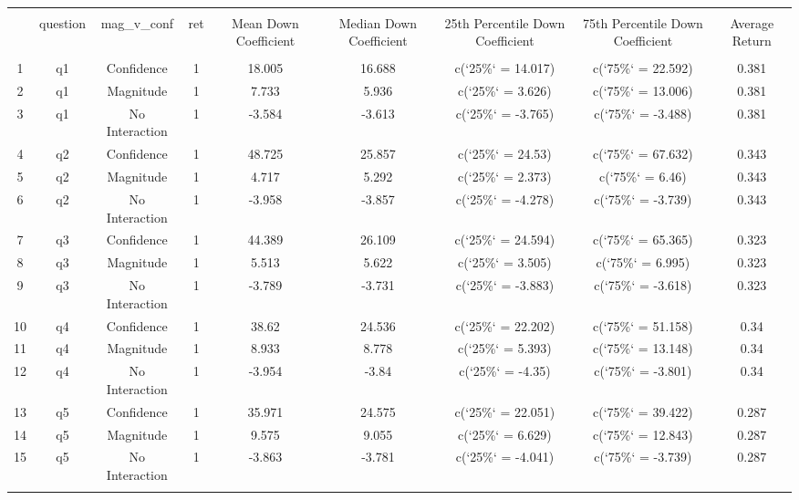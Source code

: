 
\begin{table}[!htbp] \centering 
  \caption{} 
  \label{} 
\begin{tabular}{@{\extracolsep{5pt}} ccccccccc} 
\\[-1.8ex]\hline 
\hline \\[-1.8ex] 
 & question & mag\_v\_conf & ret & Mean Down Coefficient & Median Down Coefficient & 25th Percentile Down Coefficient & 75th Percentile Down Coefficient & Average Return \\ 
\hline \\[-1.8ex] 
1 & q1 & Confidence & 1 & 18.005 & 16.688 & c(`25\%` = 14.017) & c(`75\%` = 22.592) & 0.381 \\ 
2 & q1 & Magnitude & 1 & 7.733 & 5.936 & c(`25\%` = 3.626) & c(`75\%` = 13.006) & 0.381 \\ 
3 & q1 & No Interaction & 1 & -3.584 & -3.613 & c(`25\%` = -3.765) & c(`75\%` = -3.488) & 0.381 \\ 
4 & q2 & Confidence & 1 & 48.725 & 25.857 & c(`25\%` = 24.53) & c(`75\%` = 67.632) & 0.343 \\ 
5 & q2 & Magnitude & 1 & 4.717 & 5.292 & c(`25\%` = 2.373) & c(`75\%` = 6.46) & 0.343 \\ 
6 & q2 & No Interaction & 1 & -3.958 & -3.857 & c(`25\%` = -4.278) & c(`75\%` = -3.739) & 0.343 \\ 
7 & q3 & Confidence & 1 & 44.389 & 26.109 & c(`25\%` = 24.594) & c(`75\%` = 65.365) & 0.323 \\ 
8 & q3 & Magnitude & 1 & 5.513 & 5.622 & c(`25\%` = 3.505) & c(`75\%` = 6.995) & 0.323 \\ 
9 & q3 & No Interaction & 1 & -3.789 & -3.731 & c(`25\%` = -3.883) & c(`75\%` = -3.618) & 0.323 \\ 
10 & q4 & Confidence & 1 & 38.62 & 24.536 & c(`25\%` = 22.202) & c(`75\%` = 51.158) & 0.34 \\ 
11 & q4 & Magnitude & 1 & 8.933 & 8.778 & c(`25\%` = 5.393) & c(`75\%` = 13.148) & 0.34 \\ 
12 & q4 & No Interaction & 1 & -3.954 & -3.84 & c(`25\%` = -4.35) & c(`75\%` = -3.801) & 0.34 \\ 
13 & q5 & Confidence & 1 & 35.971 & 24.575 & c(`25\%` = 22.051) & c(`75\%` = 39.422) & 0.287 \\ 
14 & q5 & Magnitude & 1 & 9.575 & 9.055 & c(`25\%` = 6.629) & c(`75\%` = 12.843) & 0.287 \\ 
15 & q5 & No Interaction & 1 & -3.863 & -3.781 & c(`25\%` = -4.041) & c(`75\%` = -3.739) & 0.287 \\ 
\hline \\[-1.8ex] 
\end{tabular} 
\end{table} 
